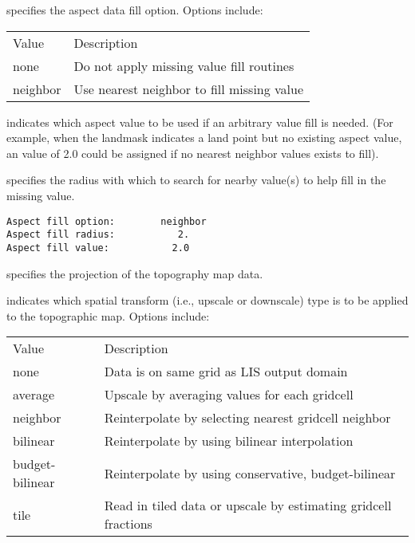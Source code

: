  
  specifies the aspect
 data fill option.  Options include:

 \begin{tabular}{ll}
 Value    & Description                                \\
 none     & Do not apply missing value fill routines   \\
 neighbor & Use nearest neighbor to fill missing value \\
 \end{tabular}

  indicates which aspect
 value to be used if an arbitrary value fill is needed. 
 (For example, when the landmask indicates a land point but no existing 
 aspect value, an value of 2.0 could be assigned if 
 no nearest neighbor values exists to fill).

  specifies the radius with which
 to search for nearby value(s) to help fill in the missing value.
 

 \begin{Verbatim}[frame=single]
Aspect fill option:        neighbor
Aspect fill radius:           2.
Aspect fill value:           2.0
 \end{Verbatim}

 
  specifies the projection of the
 topography map data.

  indicates which spatial transform
 (i.e., upscale or downscale) type is to be applied to the topographic
 map.  Options include:

 \begin{tabular}{ll}
 Value     & Description                                         \\
 none      & Data is on same grid as LIS output domain            \\
 average   & Upscale by averaging values for each gridcell       \\
 neighbor  & Reinterpolate by selecting nearest gridcell neighbor \\
 bilinear  & Reinterpolate by using bilinear interpolation        \\
 budget-bilinear & Reinterpolate by using conservative, budget-bilinear \\
 tile      &  Read in tiled data or upscale by estimating gridcell
              fractions                                            \\
 \end{tabular}
 

